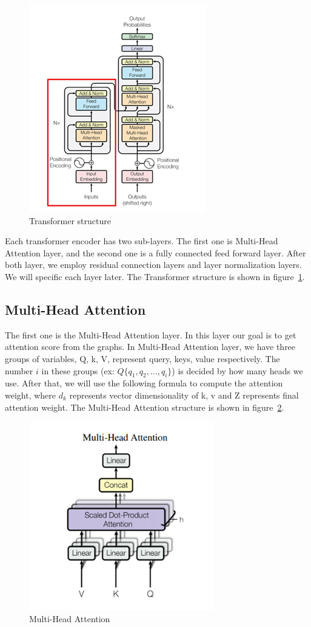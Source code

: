 \documentclass{article}
\begin{document}
\begin{figure}
    \centering
    \includegraphics[scale=0.8]{tf}
    \caption{Transformer structure}
    \label{fig:tf}
\end{figure}

Each transformer encoder has two sub-layers.
The first one is Multi-Head Attention layer,
and the second one is a fully connected feed forward layer.
After both layer, we employ residual connection layers and
layer normalization layers. We will specific each layer later.
The Transformer structure is shown in figure~\ref{fig:tf}.

\subsection{Multi-Head Attention}

The first one is the Multi-Head Attention layer.
In this layer our goal is to get attention score from the graphs.
In Multi-Head Attention layer, we have three groups of variables,
Q, k, V, represent query, keys, value respectively.
The number $i$ in these groups (ex: $Q\{q_1, q_2, \dots, q_i\}$)
is decided by how many heads we use. After that,
we will use the following formula to compute the attention weight,
where $d_k$ represents vector dimensionality of k, v and
Z represents final attention weight.
The Multi-Head Attention structure is shown in figure~\ref{fig:multihead}.

\begin{figure}
    \centering
    \includegraphics[scale=0.6]{multihead}
    \caption{Multi-Head Attention}
    \label{fig:multihead}
\end{figure}
\end{document}
